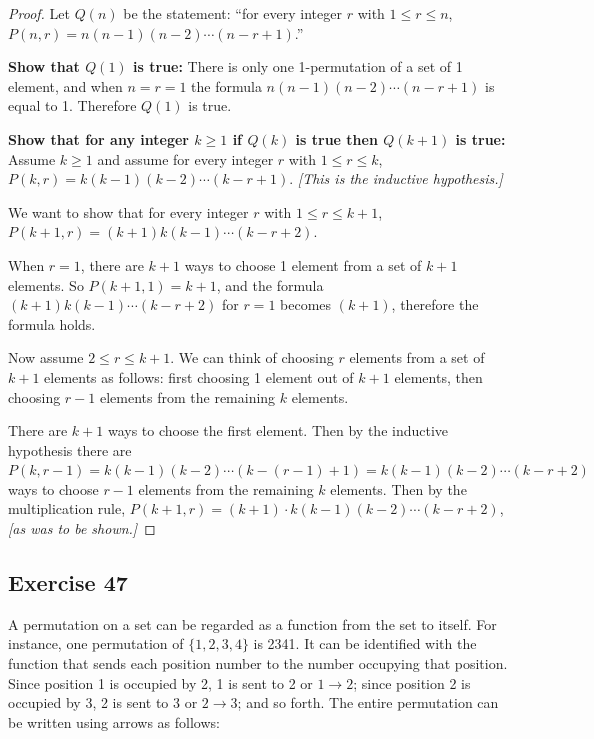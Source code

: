\documentclass[14pt]{extarticle}
\begin{document}
\begin{proof}
Let \(Q(n)\) be the statement: ``for every integer $r$ with \(1 \leq r \leq n\), 
\(P(n,r) = n(n - 1)(n - 2) \cdots (n - r + 1)\).''

{\bf Show that \(Q(1)\) is true:} There is only one 1-permutation of a set of 1 element, and when \(n=r=1\)
the formula \(n(n - 1)(n - 2) \cdots (n - r + 1)\) is equal to 1. Therefore \(Q(1)\) is true.

{\bf Show that for any integer \(k \geq 1\) if \(Q(k)\) is true then \(Q(k+1)\) is true:} Assume \(k \geq 1\) and 
assume for every integer $r$ with \(1 \leq r \leq k\), \(P(k,r) = k(k - 1)(k - 2) \cdots (k - r + 1)\). 
{\it [This is the inductive hypothesis.]}

We want to show that for every integer $r$ with \(1 \leq r \leq k+1\), \(P(k+1,r) = (k+1)k(k-1) \cdots (k-r + 2)\).

When \(r = 1\), there are $k+1$ ways to choose 1 element from a set of $k+1$ elements. So \(P(k+1,1) = k+1\), and
the formula \((k+1)k(k-1) \cdots (k-r + 2)\) for \(r = 1\) becomes \((k+1)\), therefore the formula holds.

Now assume \(2 \leq r \leq k+1\). We can think of choosing $r$ elements from a set of $k+1$ elements as follows: first
choosing 1 element out of $k+1$ elements, then choosing $r-1$ elements from the remaining $k$ elements.

There are $k+1$ ways to choose the first element. Then by the inductive hypothesis there are \(P(k, r-1) = k(k - 1)
(k - 2) \cdots (k - (r-1) + 1) = k(k - 1)(k - 2) \cdots (k - r + 2)\) ways to choose $r-1$ elements from the remaining
$k$ elements. Then by the multiplication rule, \(P(k+1,r) = (k+1) \cdot k(k - 1)(k - 2) \cdots (k - r + 2)\), 
{\it [as was to be shown.]}
\end{proof}

\subsection{Exercise 47}
A permutation on a set can be regarded as a function from the set to itself. For instance, one permutation of 
\(\{1, 2, 3, 4\}\) is 2341. It can be identified with the function that sends each position number to the number 
occupying that position. Since position 1 is occupied by 2, 1 is sent to 2 or \(1 \to 2\); since position 2 is occupied 
by 3, 2 is sent to 3 or \(2 \to 3\); and so forth. The entire permutation can be written using arrows as follows:
\end{document}
